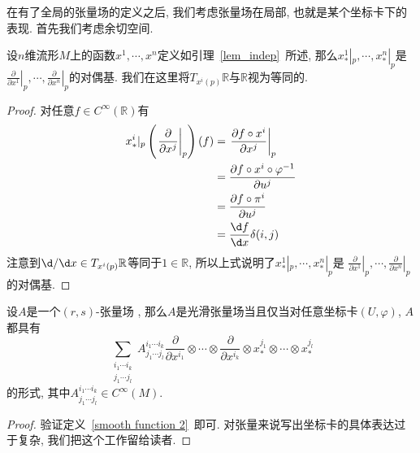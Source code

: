 在有了全局的张量场的定义之后, 我们考虑张量场在局部, 也就是某个坐标卡下的表现.
首先我们考虑余切空间.
\begin{lem}
    设$n$维流形$M$上的函数$x^1,\cdots,x^n$定义如引理~\ref{lem_indep}~所述, 那么$x^1_*|_p,\cdots,x^n_*|_p$是
    $\displaystyle\left.\frac{\partial}{\partial x^1}\right|_p,\cdots,\left.\frac{\partial}{\partial x^n}\right|_p$的对偶基.
    我们在这里将$T_{x^i(p)}\mathbb{R}$与$\mathbb{R}$视为等同的.
\end{lem}
\begin{proof}
    对任意$f\in C^\infty(\mathbb{R})$有
    \begin{align*}
        x^i_*|_p\left(\left.\frac{\partial}{\partial x^j}\right|_p\right)(f)&=\left.\frac{\partial f\circ x^i}{\partial x^j}\right|_p\\
        &=\frac{\partial f\circ x^i\circ\varphi^{-1}}{\partial u^j}\\
        &=\frac{\partial f\circ\pi^i}{\partial u^j}\\
        &=\frac{\d f}{\d x}\delta(i,j)
    \end{align*}
    注意到$\d/\d x\in T_{x^i(p)}\mathbb{R}$等同于$1\in\mathbb{R}$, 所以上式说明了$x^1_*|_p,\cdots,x^n_*|_p$是
    $\displaystyle\left.\frac{\partial}{\partial x^1}\right|_p,\cdots,\left.\frac{\partial}{\partial x^n}\right|_p$的对偶基.
\end{proof}

\begin{prop}
    设$A$是一个$(r,s)$-张量场 , 那么$A$是光滑张量场当且仅当对任意坐标卡$(U,\varphi)$, $A$都具有
    \[\sum_{\substack{i_1\cdots i_k\\j_1\cdots j_l}}A^{i_1\cdots i_k}_{j_1\cdots j_l}\frac{\partial}{\partial x^{i_1}}\otimes\cdots\otimes\frac{\partial}{\partial x^{i_k}}\otimes x^{j_1}_*\otimes\cdots\otimes x^{j_l}_*\]
    的形式, 其中$A^{i_1\cdots i_k}_{j_1\cdots j_l}\in C^\infty(M)$.
\end{prop}
\begin{proof}
    验证定义~\ref{smooth function 2}~即可.
    对张量来说写出坐标卡的具体表达过于复杂, 我们把这个工作留给读者.
\end{proof}